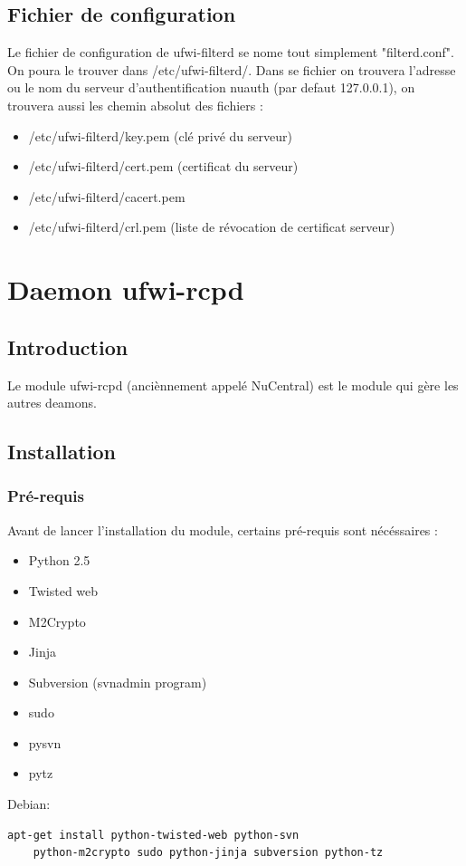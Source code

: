 \documentclass[12pt]{report}
\begin{document}
\begin{itemize}
\section{Fichier de configuration}
Le fichier de configuration de ufwi-filterd se nome tout simplement "filterd.conf". On poura le trouver dans /etc/ufwi-filterd/.
Dans se fichier on trouvera l'adresse ou le nom du serveur d'authentification nuauth (par defaut 127.0.0.1), on trouvera aussi les chemin absolut des fichiers :
\begin{itemize}
  \item /etc/ufwi-filterd/key.pem (clé privé du serveur)
  \item /etc/ufwi-filterd/cert.pem (certificat du serveur)
  \item /etc/ufwi-filterd/cacert.pem
  \item /etc/ufwi-filterd/crl.pem (liste de révocation de certificat serveur)
\end{itemize}

\chapter{Daemon ufwi-rcpd}
\section{Introduction}
Le module ufwi-rcpd (anciènnement appelé NuCentral) est le module qui gère les autres deamons.

\section{Installation}
\subsection{Pré-requis}
Avant de lancer l'installation du module, certains pré-requis sont nécéssaires :
\begin{itemize}
  \item Python 2.5
  \item Twisted web
  \item M2Crypto
  \item Jinja
  \item Subversion (svnadmin program)
  \item sudo
  \item pysvn
  \item pytz
\end{itemize}
Debian: \begin{verbatim}apt-get install python-twisted-web python-svn 
    python-m2crypto sudo python-jinja subversion python-tz\end{verbatim}
\newline


\end{itemize}
\end{document}
